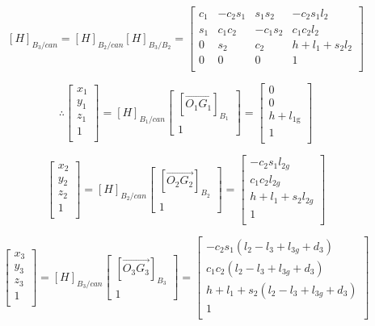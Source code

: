\documentclass[12pt,a4paper]{article}
\begin{document}
\begin{itemize}
\begin{itemize}
$$
[H]_{B_3/can} = [H]_{B_2/can} [H]_{B_3/B_2} =
\begin{bmatrix}
 c_1 & -c_2 s_1 & s_1 s_2 & -c_2 s_1 l_2 \\
 s_1 & c_1 c_2 & -c_1 s_2 & c_1 c_2 l_2 \\
 0 & s_2 & c_2 & h+l_1+s_2 l_2 \\
 0 & 0 & 0 & 1 \\
\end{bmatrix}
$$





$$ \therefore \begin{bmatrix}
x_1 \\
y_1 \\
z_1 \\
1 \\
\end{bmatrix}
=
[H]_{B_1/can}
\begin{bmatrix}
[\overrightarrow{O_1 G_1}]_{B_1} \\
1
\end{bmatrix}
=
\begin{bmatrix}
 0 \\
 0 \\
 h+l_{\text{1g}} \\
 1 \\
\end{bmatrix}
$$

$$ \begin{bmatrix}
x_2 \\
y_2 \\
z_2 \\
1 \\
\end{bmatrix}
=
[H]_{B_2/can}
\begin{bmatrix}
[\overrightarrow{O_2 G_2}]_{B_2} \\
1
\end{bmatrix}
=
\begin{bmatrix}
 -c_2 s_1 l_{2g} \\
 c_1 c_2 l_{2g} \\
 h+l_1+s_2 l_{2g} \\
 1 \\
\end{bmatrix}
$$

$$ \begin{bmatrix}
x_3 \\
y_3 \\
z_3 \\
1 \\
\end{bmatrix}
=
[H]_{B_3/can}
\begin{bmatrix}
[\overrightarrow{O_3 G_3}]_{B_3} \\
1
\end{bmatrix}
=
\begin{bmatrix}
 -c_2 s_1 (l_2-l_3+l_{3g}+d_3) \\
 c_1 c_2 (l_2-l_3+l_{3g}+d_3) \\
 h+l_1+s_2 (l_2-l_3+l_{3g}+d_3) \\
 1 \\
\end{bmatrix}
$$


\end{itemize}
\end{itemize}
\end{document}

